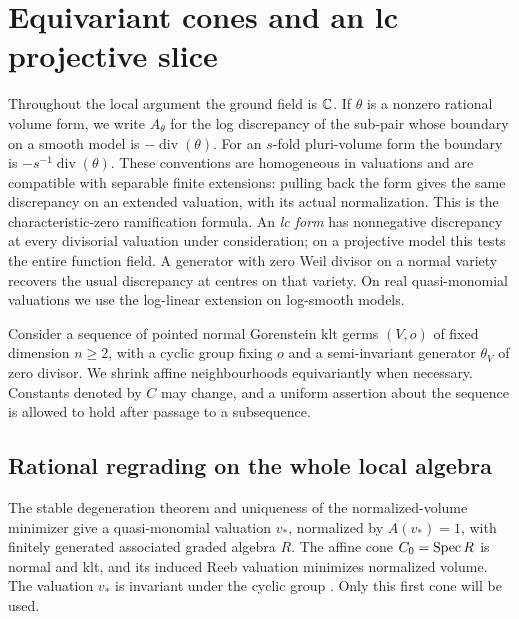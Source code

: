 \section{Equivariant cones and an lc projective slice}\label{sec:cones}

Throughout the local argument the ground field is $\mathbb C$.  If $\theta$ is
a nonzero rational volume form, we write $A_\theta$ for the log discrepancy
of the sub-pair whose boundary on a smooth model is
$-\operatorname{div}(\theta)$.  For an $s$-fold pluri-volume form the
boundary is $-s^{-1}\operatorname{div}(\theta)$.  These conventions are
homogeneous in valuations and are compatible with separable finite
extensions: pulling back the form gives the same discrepancy on an
extended valuation, with its actual normalization.  This is the
characteristic-zero ramification formula.  An \emph{lc form} has
nonnegative discrepancy at every divisorial valuation under consideration;
on a projective model this tests the entire function field.  A generator
with zero Weil divisor on a normal variety recovers the usual discrepancy
at centres on that variety.  On real quasi-monomial valuations we use the
log-linear extension on log-smooth models.

Consider a sequence of pointed normal Gorenstein klt germs $(V,o)$ of
fixed dimension $n\geq2$, with a cyclic group fixing $o$ and a
semi-invariant generator $\theta_V$ of zero divisor.  We shrink affine
neighbourhoods equivariantly when necessary.  Constants denoted by $C$
may change, and a uniform assertion about the sequence is allowed to hold
after passage to a subsequence.

\subsection{Rational regrading on the whole local algebra}

The stable degeneration theorem
\cite[Theorem~1.2(1)--(2)]{StableDegeneration} and uniqueness of the
normalized-volume minimizer \cite[Theorem~1.1]{MinimizerUniqueness}
give a quasi-monomial valuation $v_*$, normalized by $A(v_*)=1$, with
finitely generated associated graded algebra $R$. The affine cone
$C_0=\operatorname{Spec} R$ is normal and klt, and its induced Reeb valuation minimizes
normalized volume. The valuation $v_*$ is invariant under the cyclic
group \cite[Corollary~1.2]{MinimizerUniqueness}. Only this first cone
will be used.

